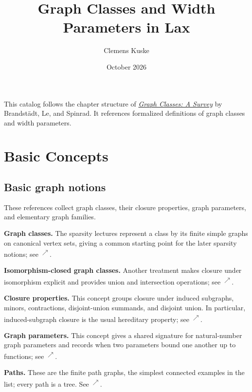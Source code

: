 \documentclass[11pt]{article}
\title{Graph Classes and Width Parameters in Lax}
\author{Clemens Kuske}
\date{October 2026}
\newcommand{\source}[2]{\textsuperscript{\href{https://laxarchive.org/#1/#2.html}{$\nearrow$}}}
\newcommand{\surveychapter}[2]{\setcounter{section}{#1}\section{#2}}
\begin{document}
\maketitle
\vspace{-1em}

This catalog follows the chapter structure of
\href{https://doi.org/10.1137/1.9780898719796}{\emph{Graph Classes: A
Survey}} by Brandst\"adt, Le, and Spinrad. It references formalized
definitions of graph classes and width parameters.

\begingroup
\small
\setlength{\parskip}{0pt}
\tableofcontents
\endgroup

\surveychapter{0}{Basic Concepts}

\subsection{Basic graph notions}

These references collect graph classes, their closure properties, graph
parameters, and elementary graph families.

\textbf{Graph classes.}
The sparsity lectures represent a class by its finite
simple graphs on canonical vertex sets, giving a common starting point for
the later sparsity notions; see
\source{lax-199508}{Lax199508.GraphClasses}.

\textbf{Isomorphism-closed graph classes.}
Another treatment makes closure
under isomorphism explicit and provides union and intersection operations;
see \source{lax-871432}{Lax871432.GraphClasses}.

\textbf{Closure properties.}
This concept groups closure under induced
subgraphs, minors, contractions, disjoint-union summands, and disjoint union.
In particular, induced-subgraph closure is the usual hereditary property;
see \source{lax-871432}{Lax871432.ClosureProperties}.

\textbf{Graph parameters.}
This concept gives a shared signature for
natural-number graph parameters and records when two parameters bound one
another up to functions; see
\source{lax-153141}{Lax153141.GraphParameters}.

\textbf{Paths.}
These are the finite path graphs, the simplest connected
examples in the list; every path is a tree. See
\source{lax-68}{Lax68.Paths}.
\end{document}
